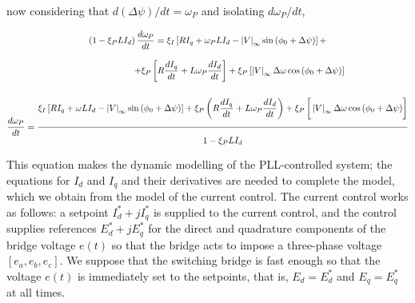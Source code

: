 \begin{example}
	\noindent now considering that $d\left(\Delta\psi\right)/dt = \omega_P$ and isolating $d\omega_P/dt$,

\begin{gather}
        \left(1-\xi_P LI_d\right)\dfrac{d\omega_P}{dt} = \xi_I\left[ RI_q + \omega_P L I_d - \left|V\right|_\infty\sin\left(\phi_0+\Delta\psi\right)\right] + \\[3mm] \hspace{25mm} +  \xi_P\left[  R \dfrac{dI_q}{dt} + L\omega_P \dfrac{dI_d}{dt}\right] + \xi_P\left[ \left|V\right|_\infty\Delta\omega \cos\left(\phi_0+\Delta\psi\right) \right] \nonumber\\[5mm]
%
        \dfrac{d\omega_P}{dt} = \xfrac{5mm}{3mm}{\xi_I\left[ RI_q + \omega L I_d - \left|V\right|_\infty\sin\left(\phi_0+\Delta\psi\right)\right] + \xi_P\left(R \dfrac{dI_q}{dt} + L\omega_P \dfrac{dI_d}{dt}\right) + \xi_P\left[\raisebox{5mm}{} \left|V\right|_\infty\Delta\omega \cos\left(\phi_0 + \Delta\psi\right) \right]}{1-\xi_PLI_d} \label{eq:diffomega_diq_did}
\end{gather}

	This equation makes the dynamic modelling of the PLL-controlled system; the equations for $I_d$ and $I_q$ and their derivatives are needed to complete the model, which we obtain from the model of the current control. The current control works as follows: a setpoint $I_d^* + jI_q^*$ is supplied to the current control, and the control supplies references $E^*_d + jE^*_q$ for the direct and quadrature components of the bridge voltage $e(t)$ so that the bridge acts to impose a three-phase voltage $\left[e_a,e_b,e_c\right]$. We suppose that the switching bridge is fast enough so that the voltage $e(t)$ is immediately set to the setpoints, that is, $E_d = E^*_d$ and $E_q = E^*_q$ at all times.

\begin{figure} 
\centering
{}
\end{figure}
\end{example}
